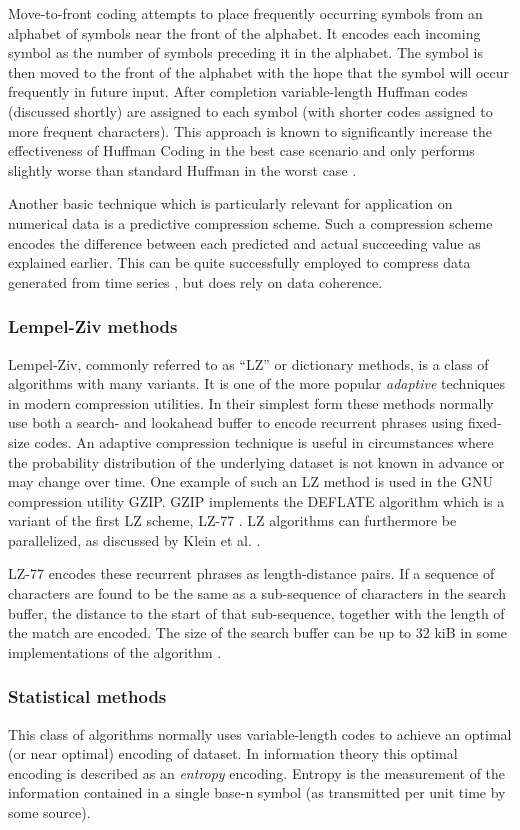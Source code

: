 Move-to-front coding attempts to place frequently occurring symbols from an alphabet of symbols near the front of the alphabet. It encodes each incoming symbol as the number of 
symbols preceding it in the alphabet. The symbol is then moved to the front of the alphabet with the hope that the symbol will occur frequently in future input. After completion 
variable-length Huffman codes (discussed shortly) are assigned to each symbol (with shorter codes assigned to more frequent characters). This approach is known to significantly increase 
the effectiveness of Huffman Coding in the best case scenario and only performs slightly worse than standard Huffman in the worst case \cite[ch. 1]{salomon2004data}. 

Another basic technique which is particularly relevant for application on numerical data is a predictive compression scheme. Such a compression scheme encodes the 
difference between each predicted and actual succeeding value as explained earlier. This can be quite successfully employed to compress data 
generated from time series \cite{engelson2000lossless}, but does rely on data coherence.
\subsubsection{Lempel-Ziv methods}
Lempel-Ziv, commonly referred to as “LZ” or dictionary methods, is a class of algorithms with many variants. It is one of the more popular \textit{adaptive} techniques 
in modern compression utilities. In their simplest form these methods normally use both a search- and lookahead buffer to encode recurrent phrases using fixed-size codes. An 
adaptive compression technique is useful in circumstances where the probability distribution of the underlying dataset is not known in advance or may change over time. 
One example of such an LZ method is used in the GNU compression utility GZIP. GZIP implements the DEFLATE algorithm which is a variant of the first LZ scheme, LZ-77 
\cite[ch. 3]{salomon2004data}. LZ algorithms can furthermore be parallelized, as discussed by Klein et al. \cite{klein2005parallel}. 

LZ-77 encodes these recurrent phrases as length-distance pairs. If a sequence of characters are found to be the same as a sub-sequence of characters in the search buffer, the 
distance to the start of that sub-sequence, together with the length of the match are encoded. The size of the search buffer can be up to 32 kiB in some implementations of the 
algorithm \cite[ch. 3]{salomon2004data}.
\subsubsection{Statistical methods}
This class of algorithms normally uses variable-length codes to achieve an optimal (or near optimal) encoding of dataset. In information theory this optimal encoding is 
described as an \textit{entropy} encoding. Entropy is the measurement of the information contained in a single base-n symbol (as transmitted per unit time by some source).

